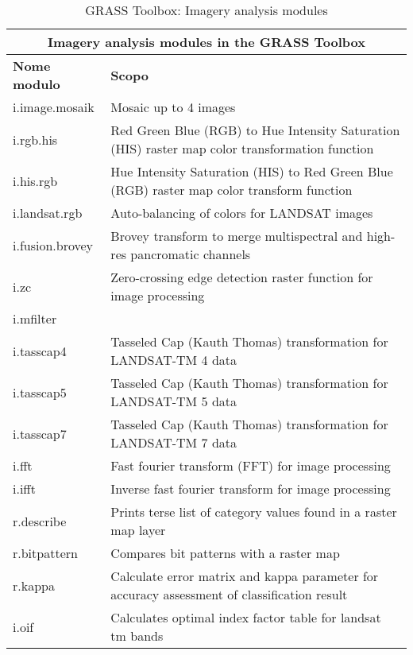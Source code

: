\begin{table}[ht]
\centering
\caption{GRASS Toolbox: Imagery analysis modules}\medskip
 \begin{tabular}{|p{4cm}|p{12cm}|}
  \hline \multicolumn{2}{|c|}{\textbf{Imagery analysis modules in the GRASS
  Toolbox}} \\
  \hline \textbf{Nome modulo} & \textbf{Scopo} \\
  \hline i.image.mosaik & Mosaic up to 4 images \\
  \hline i.rgb.his & Red Green Blue (RGB) to Hue Intensity Saturation (HIS)
  raster map color transformation function \\
  \hline i.his.rgb & Hue Intensity Saturation (HIS) to Red Green Blue (RGB)
  raster map color transform function \\
  \hline i.landsat.rgb & Auto-balancing of colors for LANDSAT images \\
  \hline i.fusion.brovey & Brovey transform to merge multispectral and
  high-res pancromatic channels \\
  \hline i.zc & Zero-crossing edge detection raster function for image
  processing \\
  \hline i.mfilter &  \\
  \hline i.tasscap4 & Tasseled Cap (Kauth Thomas) transformation for
  LANDSAT-TM 4 data \\
  \hline i.tasscap5 & Tasseled Cap (Kauth Thomas) transformation for
  LANDSAT-TM 5 data \\
  \hline i.tasscap7 & Tasseled Cap (Kauth Thomas) transformation for
  LANDSAT-TM 7 data \\
  \hline i.fft & Fast fourier transform (FFT) for image processing \\
  \hline i.ifft & Inverse fast fourier transform for image processing \\
  \hline r.describe & Prints terse list of category values found in a raster
  map layer \\
  \hline r.bitpattern & Compares bit patterns with a raster map \\
  \hline r.kappa & Calculate error matrix and kappa parameter for accuracy
  assessment of classification result \\
  \hline i.oif & Calculates optimal index factor table for landsat tm bands \\
\hline
\end{tabular}
\end{table}

\clearpage

